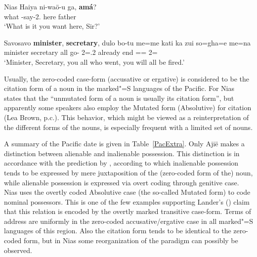 
\begin{exe}
\ex\label{NiaVoc} {Nias}  \citep[59]{Brown:2001} 
\gll Haiya ni-wa\"o-u ga,  \textbf{am\'a}?\\
what \pass{}-say-2\sg{}.\poss{} here father\\
`What is it you want here, Sir?'
\end{exe}

\begin{exe}\ex\label{SavVoc} {Savosavo} \citep[127]{Wegener:2008}\nopagebreak[4]
\gll \textbf{minister}, \textbf{secretary}, dulo bo-tu me=me kati ka zui so=gha=e me=na\\
minister secretary all go-\relativ{} 2\pl{}=\emphat{}.2\pl{} \cert{} already end \att{}=\pl{}=\emphat{} 2\pl{}=\nom{}\\
`Minister, Secretary, you all who went, you will all be fired.'
\end{exe}


Usually, the zero-coded case-form (accusative or ergative) is considered to be the citation form of a noun in the marked"=S languages of the Pacific. 
For Nias \citet[69]{Brown:2001} states that the ``unmutated form of a noun is usually its citation form'', but apparently some speakers also employ the Mutated form (Absolutive) for citation (Lea Brown, p.c.). 
This behavior, which might be viewed as a reinterpretation of the different forms of the nouns, is especially frequent with a limited set of nouns.

A summary of the Pacific date is given in Table~\ref{PacExtra}. 
Only Aji\"e makes a distinction between alienable and inalienable possession. 
This distinction is in accordance with the prediction by \citet[4--5]{Chappell:1996}, according to which inalienable possession tends to be expressed by mere juxtaposition of the (zero-coded form of the) noun, while alienable possession is expressed via overt coding through genitive case.
Nias uses the overtly coded Absolutive case (the so-called Mutated form) to code nominal possessors. 
This is one of the few examples supporting Lander's (\citeyear[590]{Lander:2009}) claim that this relation is encoded by the overtly marked transitive case-form. 
Terms of address are uniformly in the zero-coded accusative/ergative case in all marked"=S languages of this region.
Also the citation form tends to be identical to the zero-coded form, but in Nias some reorganization of the paradigm can possibly be observed.

